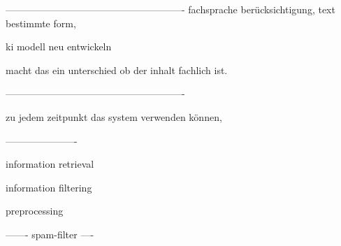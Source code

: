 \documentclass[a4paper,12pt]{scrreprt}
\begin{document}
-------------------------------------------------------
fachsprache berücksichtigung, text bestimmte form,

ki modell neu entwickeln

macht das ein unterschied ob der inhalt fachlich ist.



-------------------------------------------------------

zu jedem zeitpunkt das system verwenden können,

----------------------

information retrieval

\cite{kobayashi2000information}

\cite{singhal2001modern}

\cite{croft2000combining}

\cite{horesh2016information}

\cite{belkin1992information}

information filtering
\cite{lanquillon2001enhancing}

preprocessing
\cite{alasadi2017review}

-------
spam-filter
\cite{shafi2017review}
\cite{khorsi2007overview}
\cite{tretyakov2004machine}
----













%







%
%
\raggedright
\printbibliography
\end{document}
